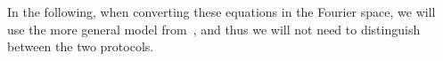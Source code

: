 \documentclass{masterthesis}
\begin{document}
In the following, when converting these equations in the Fourier space, we will use the more general model from~\cite{Li_2021}, and thus we will not need to distinguish between the two protocols.






\end{document}
